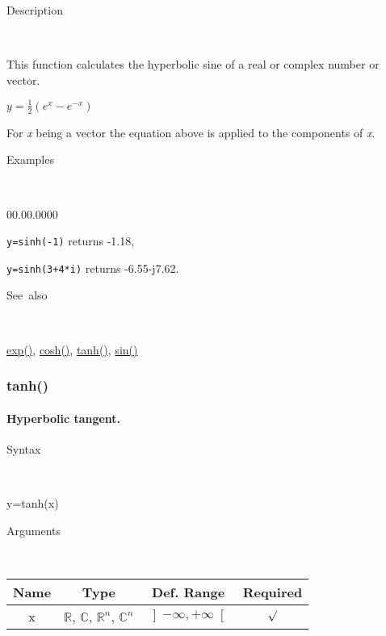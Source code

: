 \begin{description}
\item [Description]~
\end{description}
This function calculates the hyperbolic sine of a real or complex
number or vector.

\medskip{}
$y=\frac{1}{2}\left(e^{x}-e^{-x}\right)$ 
\medskip{}

For \textit{x} being a vector the equation above is applied
to the components of \textit{x}.

\begin{description}
\item [Examples]~
\end{description}
\begin{lyxlist}{00.00.0000}
\item [\texttt{y=sinh(-1)}]returns -1.18,
\item [\texttt{y=sinh(3+4{*}i)}]returns -6.55-j7.62.
\end{lyxlist}
\begin{description}
\item [See~also]~
\end{description}
\textcolor{blue}{\hyperlink{exp}{exp()}}\textcolor{black}{,} \textcolor{blue}{\hyperlink{cosh}{cosh()}}\textcolor{black}{,}
\textcolor{blue}{\hyperlink{tanh}{tanh()}}\textcolor{black}{,} \textcolor{blue}{\hyperlink{sin}{sin()}}


\newpage
\subsubsection*{\hypertarget{tanh}{}{\Large tanh()}}


\paragraph{\label{par:Hyperbolic-tangent}Hyperbolic tangent.}

\begin{description}
\item [Syntax]~
\end{description}
y=tanh(x)

\begin{description}
\item [Arguments]~
\end{description}
\begin{tabular}{|c|c|c|c|}
\hline 
Name&
Type&
Def. Range&
Required\tabularnewline
\hline
\hline 
x&
$\mathbb{R}$, $\mathbb{C}$, $\mathbb{R}^{n}$, $\mathbb{C}^{n}$&
$\left]-\infty,+\infty\right[$&
$\surd$\tabularnewline
\hline
\end{tabular}

